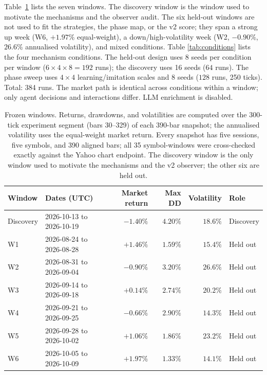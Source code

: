 \documentclass[11pt]{article}
\begin{document}
Table~\ref{tab:windows} lists the seven windows. The discovery window is the
window used to motivate the mechanisms and the observer audit. The six held-out
windows are not used to fit the strategies, the phase map, or the v2 score; they
span a strong up week (W6, $+1.97\%$ equal-weight), a down/high-volatility week
(W2, $-0.90\%$, $26.6\%$ annualised volatility), and mixed conditions. Table
\ref{tab:conditions} lists the four mechanism conditions. The held-out design
uses 8 seeds per condition per window ($6\times4\times8=192$ runs); the discovery
uses 16 seeds ($64$ runs). The phase sweep uses $4\times4$ learning/imitation
scales and 8 seeds ($128$ runs, 250 ticks). Total: 384 runs. The market path is
identical across conditions within a window; only agent decisions and
interactions differ. LLM enrichment is disabled.

\begin{table}[t]
  \centering
  \small
  \setlength{\tabcolsep}{4pt}
  \caption{Frozen windows. Returns, drawdowns, and volatilities are computed over
  the 300-tick experiment segment (bars 30--329) of each 390-bar snapshot; the
  annualised volatility uses the equal-weight market return. Every snapshot has
  five sessions, five symbols, and 390 aligned bars; all 35 symbol-windows were
  cross-checked exactly against the Yahoo chart endpoint. The discovery window is
  the only window used to motivate the mechanisms and the v2 observer; the other
  six are held out.}
  \label{tab:windows}
  \begin{tabular}{llrrrl}
    \toprule
    Window & Dates (UTC) & Market return & Max DD & Volatility & Role\\
    \midrule
    Discovery & 2026-10-13 to 2026-10-19 & $-1.40\%$ & $4.20\%$ & $18.6\%$ & Discovery\\
    W1 & 2026-08-24 to 2026-08-28 & $+1.46\%$ & $1.59\%$ & $15.4\%$ & Held out\\
    W2 & 2026-08-31 to 2026-09-04 & $-0.90\%$ & $3.20\%$ & $26.6\%$ & Held out\\
    W3 & 2026-09-14 to 2026-09-18 & $+0.14\%$ & $2.74\%$ & $20.2\%$ & Held out\\
    W4 & 2026-09-21 to 2026-09-25 & $-0.66\%$ & $2.90\%$ & $14.3\%$ & Held out\\
    W5 & 2026-09-28 to 2026-10-02 & $+1.06\%$ & $1.86\%$ & $23.2\%$ & Held out\\
    W6 & 2026-10-05 to 2026-10-09 & $+1.97\%$ & $1.33\%$ & $14.1\%$ & Held out\\
    \bottomrule
  \end{tabular}
\end{table}
\end{document}
